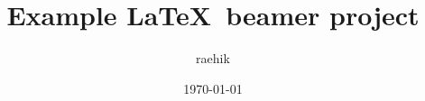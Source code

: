\newcommand{\addmylib}[1]{}
\newcommand{\addsrc}[1]{}

\addmylib{preamble-beamer}



\title{Example \LaTeX\ beamer project}
\author{raehik}

\date{\today}

\addsrc{title}
\addsrc{part-intro}
\ifxetex
    \addsrc{part-jp}
\fi



